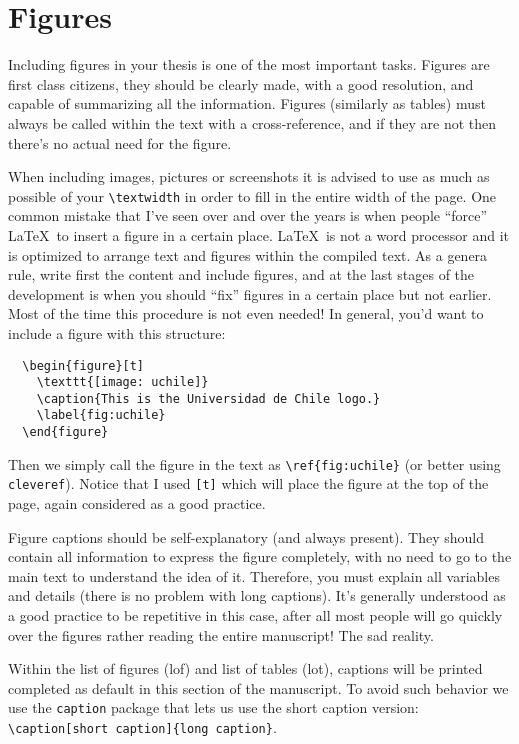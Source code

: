 \section{Figures}

Including figures in your thesis is one of the most important tasks. Figures are first class citizens, they should be clearly made, with a good resolution, and capable of summarizing all the information. Figures (similarly as tables) must always be called within the text with a cross-reference, and if they are not then there's no actual need for the figure.

When including images, pictures or screenshots it is advised to use as much as possible of your \verb|\textwidth| in order to fill in the entire width of the page. One common mistake that I've seen over and over the years is when people ``force'' \LaTeX\ to insert a figure in a certain place. \LaTeX\ is not a word processor and it is optimized to arrange text and figures within the compiled text. As a genera rule, write first the content and include figures, and at the last stages of the development is when you should ``fix'' figures in a certain place but not earlier. Most of the time this procedure is not even needed!
In general, you'd want to include a figure with this structure:
\begin{verbatim}
  \begin{figure}[t]
    \texttt{[image: uchile]}
    \caption{This is the Universidad de Chile logo.}
    \label{fig:uchile}
  \end{figure}
\end{verbatim}
Then we simply call the figure in the text as \verb|\ref{fig:uchile}| (or better using \texttt{cleveref}). Notice that I used \texttt{[t]} which will place the figure at the top of the page, again considered as a good practice.

Figure captions should be self-explanatory (and always present). They should contain all information to express the figure completely, with no need to go to the main text to understand the idea of it. Therefore, you must explain all variables and details (there is no problem with long captions). It's generally understood as a good practice to be repetitive in this case, after all most people will go quickly over the figures rather reading the entire manuscript! The sad reality.

Within the list of figures (lof) and list of tables (lot), captions will be printed completed as default in this section of the manuscript. To avoid such behavior we use the \texttt{caption} package that lets us use the short caption version: \verb|\caption[short caption]{long caption}|.

